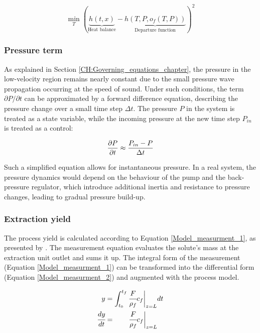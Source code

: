 \documentclass[a4paper,fleqn]{cas-dc}
\begin{document}
		{\footnotesize
			\begin{equation}
				\min_T \left( \underbrace{h\left(t,x\right)}_{\text{Heat balance}} - \underbrace{h\left(T,P,o_f\left(T,P\right)\right)}_{\text{Departure function}} \right)^2
				\label{EQ:Enthalpy_root}
			\end{equation}
		}
		
		\subsubsection{Pressure term} \label{CH: Pressure}
		
		As explained in Section \ref{CH:Governing_equations_chapter}, the pressure in the low-velocity region remains nearly constant due to the small pressure wave propagation occurring at the speed of sound. Under such conditions, the term $\partial P/\partial t$ can be approximated by a forward difference equation, describing the pressure change over a small time step $\Delta t$. The pressure $P$ in the system is treated as a state variable, while the incoming pressure at the new time step $P_{in}$ is treated as a control:
		
		{\footnotesize
			\begin{equation}
				\frac{\partial {\color{black}P}}{\partial t} \approx \frac{{\color{black}P_{in}} - {\color{black}P} }{\Delta t}
		\end{equation}}
		
		Such a simplified equation allows for instantaneous pressure. In a real system, the pressure dynamics would depend on the behaviour of the pump and the back-pressure regulator, which introduce additional inertia and resistance to pressure changes, leading to gradual pressure build-up.
		
		\subsubsection{Extraction yield} \label{CH: Yield}
		
		The process yield is calculated according to Equation \ref{Model_measurment_1}, as presented by \citet{Sovova1994a}. The measurement equation evaluates the solute's mass at the extraction unit outlet and sums it up. The integral form of the measurement (Equation \ref{Model_measurment_1}) can be transformed into the differential form (Equation \ref{Model_measurment_2}) and augmented with the process model.
		
		{\footnotesize
			\begin{align} 
				\label{Model_measurment_1}
				y &= \int_{t_0}^{t_f} \cfrac{F}{\rho_f} c_f \biggr\rvert_{z=L} dt \\
				\cfrac{dy}{dt} &= \qquad \cfrac{F}{\rho_f} c_f \biggr\rvert_{z=L} 
				\label{Model_measurment_2}
		\end{align}	}
		
\end{document}
